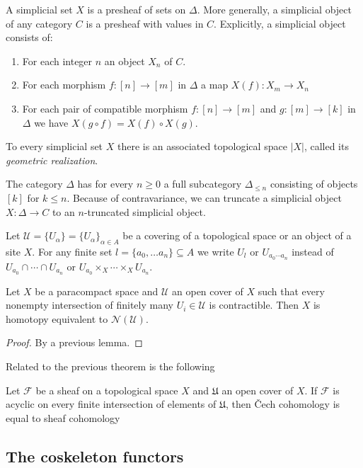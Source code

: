 A simplicial set $X$ is a presheaf of sets on $\Delta$. More generally, a simplicial object of any category $C$ is a presheaf with values in $C$.  Explicitly, a simplicial object consists of:
\begin{enumerate}
  \item For each integer $n$ an object $X_n$ of $C$.
  \item For each morphism $f: [n] \to [m]$ in $\Delta$ a map $X(f) : X_m \to X_n$
  \item For each pair of compatible morphism $f: [n] \to [m]$ and $g: [m] \to [k]$ in $\Delta$ we have $X(g \circ f) = X(f) \circ X(g)$.
\end{enumerate}
To every simplicial set $X$ there is an associated topological space $|X|$, called its \textit{geometric realization}.

The category $\Delta$ has for every $n \ge 0$ a full subcategory $\Delta_{\le n}$ consisting of objects $[k]$ for $k \le n$. Because of contravariance, we can truncate a simplicial object $X: \Delta \to C$ to an $n$-truncated simplicial object.


Let $\mathcal{U} = \{U_\alpha\} = \{U_\alpha\}_{\alpha \in A}$ be a covering of a topological space or an object of a site $X$. For any finite set $l = \{a_0, \dots a_n\} \subseteq A$ we write $U_l$ or $U_{a_0 \cdots a_n}$ instead of $U_{a_0} \cap \cdots \cap U_{a_n}$ or $U_{a_0} \times_X \cdots \times_X U_{a_n}$.

\begin{theorem}
  Let $X$ be a paracompact space and $\mathcal{U}$ an open cover of $X$ such that every nonempty intersection of finitely many $U_i \in \mathcal{U}$ is contractible. Then $X$ is homotopy equivalent to $\mathcal{N(U)}$.
\end{theorem}
\begin{proof}
  By a previous lemma. %

\end{proof}

Related to the previous theorem is the following
\begin{theorem}
  Let $\mathcal{F}$ be a sheaf on a topological space $X$ and $\mathfrak{U}$ an open cover of $X$. If $\mathcal{F}$ is acyclic on every finite intersection of elements of $\mathfrak{U}$, then \v{C}ech cohomology is equal to sheaf cohomology
\end{theorem}

\subsection{The coskeleton functors}

